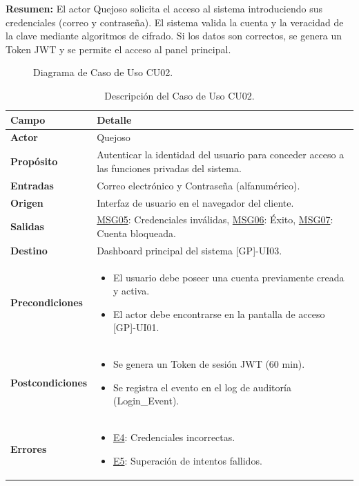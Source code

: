 \begin{appendices}
\textbf{Resumen:} 
El actor Quejoso solicita el acceso al sistema introduciendo sus credenciales (correo y contraseña). El sistema valida la cuenta y la veracidad de la clave mediante algoritmos de cifrado. Si los datos son correctos, se genera un Token JWT y se permite el acceso al panel principal.

\begin{figure}[htbp]
    \centering
    \figCUdos 
    \caption{Diagrama de Caso de Uso CU02.}
    \label{fig:cu02}
\end{figure}

\begin{table}[htbp]
\centering
\small
\begin{tabular}{|p{3.5cm}|p{10.5cm}|}
\hline
\rowcolor[HTML]{EFEFEF} 
\textbf{Campo} & \textbf{Detalle} \\ \hline
\textbf{Actor} & Quejoso \\ \hline
\textbf{Propósito} & Autenticar la identidad del usuario para conceder acceso a las funciones privadas del sistema. \\ \hline
\textbf{Entradas} & Correo electrónico y Contraseña (alfanumérico). \\ \hline
\textbf{Origen} & Interfaz de usuario en el navegador del cliente. \\ \hline
\textbf{Salidas} & \hyperlink{msg:MSG05}{MSG05}: Credenciales inválidas, \hyperlink{msg:MSG06}{MSG06}: Éxito, \hyperlink{msg:MSG07}{MSG07}: Cuenta bloqueada. \\ \hline
\textbf{Destino} & Dashboard principal del sistema [GP]-UI03. \\ \hline
\textbf{Precondiciones} & 
\begin{itemize}[nosep, leftmargin=*]
    \item El usuario debe poseer una cuenta previamente creada y activa.
    \item El actor debe encontrarse en la pantalla de acceso [GP]-UI01.
\end{itemize} \\ \hline
\textbf{Postcondiciones} & 
\begin{itemize}[nosep, leftmargin=*]
    \item Se genera un Token de sesión JWT (60 min).
    \item Se registra el evento en el log de auditoría (Login\_Event).
\end{itemize} \\ \hline
\textbf{Errores} & 
\begin{itemize}[nosep, leftmargin=*]
    \item \hyperlink{err:E4}{E4}: Credenciales incorrectas.
    \item \hyperlink{err:E5}{E5}: Superación de intentos fallidos.
\end{itemize} \\ \hline
\end{tabular}
\caption{Descripción del Caso de Uso CU02.}
\label{tab:cu02_especificacion}
\end{table}


\end{appendices}
